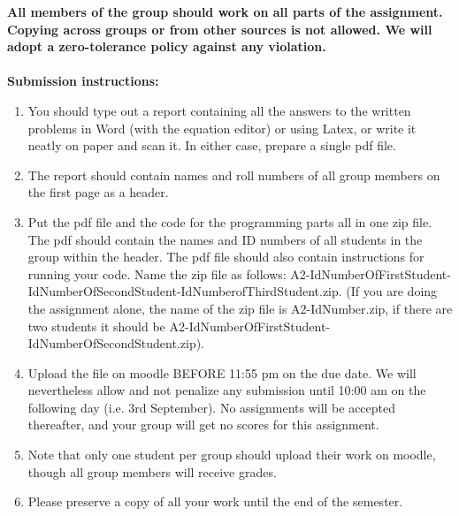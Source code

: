 \documentclass[11pt]{article}
\begin{document}
\maketitle

\textbf{All members of the group should work on all parts of the assignment. Copying across groups or from other sources is not allowed. We will adopt a \textbf{zero-tolerance policy} against any violation.}
\\
\\
\textbf{Submission instructions:} 
\begin{enumerate}
\item You should type out a report containing all the answers to the written problems in Word (with the equation editor) or using Latex, or write it neatly on paper and scan it. In either case, prepare a single pdf file. 
\item The report should contain names and roll numbers of all group members on the first page as a header.
\item Put the pdf file and the code for the programming parts all in one zip file. The pdf should contain the names and ID numbers of all students in the group within the header. The pdf file should also contain instructions for running your code. Name the zip file as follows: A2-IdNumberOfFirstStudent-IdNumberOfSecondStudent-IdNumberofThirdStudent.zip. (If you are doing the assignment alone, the name of the zip file is A2-IdNumber.zip, if there are two students it should be A2-IdNumberOfFirstStudent-IdNumberOfSecondStudent.zip). 
\item Upload the file on moodle BEFORE 11:55 pm on the due date. We will nevertheless allow and not penalize any submission until 10:00 am on the following day (i.e. 3rd September). No assignments will be accepted thereafter, and your group will get no scores for this assignment. 
\item Note that only one student per group should upload their work on moodle, though all group members will receive grades. 
\item Please preserve a copy of all your work until the end of the semester. 
\end{enumerate}
\end{document}
